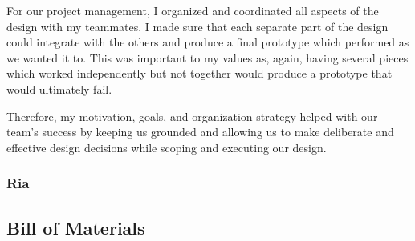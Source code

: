 \documentclass[12pt]{article}
\begin{document}
\begin{multicols*}{2}
                For our project management, I organized and coordinated all aspects of the design with my teammates. I made sure that each separate part of the design could integrate with the others and produce a final prototype which performed as we wanted it to. This was important to my values as, again, having several pieces which worked independently but not together would produce a prototype that would ultimately fail. 

                Therefore, my motivation, goals, and organization strategy helped with our team's success by keeping us grounded and allowing us to make deliberate and effective design decisions while scoping and executing our design.


            \subsubsection{Ria}

            
        \subsection{Bill of Materials}


\end{multicols*}
\end{document}
